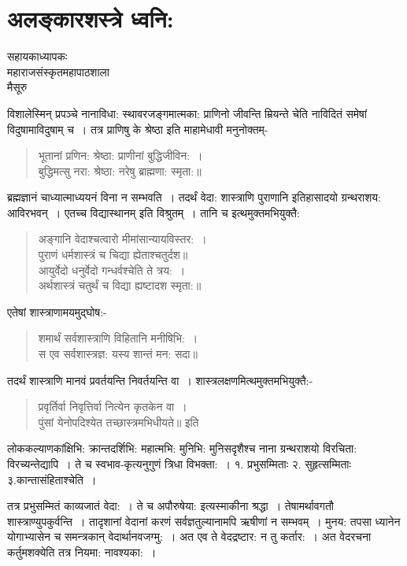 {\fontsize{15}{17}\selectfont
\presetvalues
\chapter{अलङ्कारशस्त्रे ध्वनि:}

\begin{center}
\smallskip
सहायकाध्यापकः\\
महाराजसंस्कृतमहापाठशाला\\
मैसूरु
\addrule
\end{center}
विशालेस्मिन् प्रपञ्चे नानाविधा: स्थावरजङ्गमात्मका: प्राणिनो जीवन्ति म्रियन्ते चेति नाविदितं समेषां विदुषामाविदुषाम् च~। तत्र प्राणिषु के श्रेष्ठा इति माहामेधावी मनुनोक्तम्-
\begin{verse}
भूतानां प्रणिन: श्रेष्ठा: प्राणीनां बुद्धिजीविन:~। \\
बुद्धिमत्सु नरा: श्रेष्ठा: नरेषु ब्राह्मणा: स्मृता:॥
\end{verse}
ब्रह्मज्ञानं चाध्यात्माध्ययनं विना न सम्भवति~। तदर्थं वेदा: शास्त्राणि पुराणानि इतिहासादयो ग्रन्थराशय: आविरभवन्~। एतच्च विद्यास्थानम् इति विश्रुतम्~। तानि च इत्थमुक्तमभियुक्तै: 
\begin{verse}
अङ्गानि वेदाश्चत्वारो मीमांसान्यायविस्तर:~। \\
पुराणं धर्मशास्त्रं च चिद्या ह्येताश्चतुर्दश॥\\
आयुर्वेदो धनुर्वेदो गन्धर्वश्चेति ते त्रय:~। \\
अर्थशास्त्रं चतुर्थं च विद्या ह्यष्टादश स्मृता:॥
\end{verse}
एतेषां शास्त्राणामयमुद्घोष:-
\begin{verse}
शमार्थं सर्वशास्त्राणि विहितानि मनीषिभि:~। \\
स एव सर्वशास्त्रज्ञ: यस्य शान्तं मन: सदा॥
\end{verse}
तदर्थं शास्त्राणि मानवं प्रवर्तयन्ति निवर्तयन्ति वा~। शास्त्रलक्षणमित्थमुक्तमभियुक्तै:-
\begin{verse}
प्रवृर्तिर्वा निवृत्तिर्वा नित्येन कृतकेन वा~। \\
पुंसां येनोपदिश्येत तच्छास्त्रमभिधीयते॥ इति
\end{verse}
लोककल्याणकांक्षिभि: क्रान्तदर्शिभि: महात्मभि: मुनिभि: मुनिसदृशैश्च नाना ग्रन्थराशयो विरचिता: विरच्यन्तेद्यापि~। ते च स्वभाव-कृत्यनुगुणं त्रिधा विभक्ता:~। १. प्रभुसम्मिताः   २. सुहृत्सम्मिताः  ३.कान्तासंहिताश्चेति~। 

तत्र प्रभुसम्मितं काव्यजातं वेदा:~। ते च अपौरुषेया: इत्यस्माकीना श्रद्धा~। तेषामर्थावगतौ शास्त्राण्युपकुर्वन्ति~। तादृशानां वेदानां करणं सर्वज्ञतुल्यानामपि ऋषीणां न सम्भवम्~। मुनय: तपसा ध्यानेन योगाभ्यासेन च समन्त्रकान् वेदार्थानवजग्मु:~। अत एव ते वेदद्रष्टार: न तु कर्तार:~। अत वेदरचना कर्तुमशक्येति तत्र नियमा: नावश्यका:~। 

}
